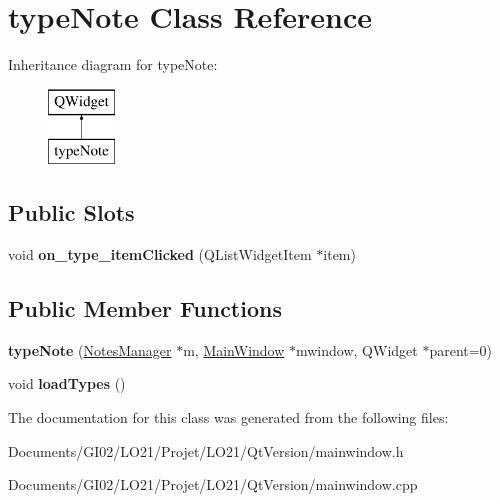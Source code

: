 \hypertarget{classtype_note}{}\section{type\+Note Class Reference}
\label{classtype_note}
Inheritance diagram for type\+Note\+:\begin{figure}[H]
\begin{center}
\leavevmode
\includegraphics[height=2.000000cm]{classtype_note}
\end{center}
\end{figure}
\subsection*{Public Slots}
\begin{DoxyCompactItemize}
\item 
\mbox{\label{classtype_note_aebcf12ad2c03d4615a72805f97881ca6}} 
void {\bfseries on\+\_\+type\+\_\+item\+Clicked} (Q\+List\+Widget\+Item $\ast$item)
\end{DoxyCompactItemize}
\subsection*{Public Member Functions}
\begin{DoxyCompactItemize}
\item 
\mbox{\label{classtype_note_a973aece0bad28b7c0265b14b7b82c8b4}} 
{\bfseries type\+Note} (\hyperlink{class_notes_manager}{Notes\+Manager} $\ast$m, \hyperlink{class_main_window}{Main\+Window} $\ast$mwindow, Q\+Widget $\ast$parent=0)
\item 
\mbox{\label{classtype_note_a367f23d98b0f1d749a6f4ee18998bf38}} 
void {\bfseries load\+Types} ()
\end{DoxyCompactItemize}


The documentation for this class was generated from the following files\+:\begin{DoxyCompactItemize}
\item 
Documents/\+G\+I02/\+L\+O21/\+Projet/\+L\+O21/\+Qt\+Version/mainwindow.\+h\item 
Documents/\+G\+I02/\+L\+O21/\+Projet/\+L\+O21/\+Qt\+Version/mainwindow.\+cpp\end{DoxyCompactItemize}
